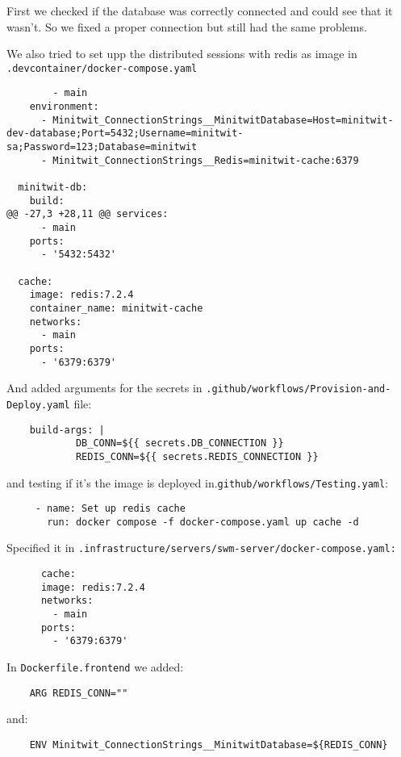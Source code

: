 First we checked if the database was correctly connected and could see that it wasn't. So we fixed a proper connection but still had the same problems.

We also tried to set upp the distributed sessions with redis as image in \texttt{.devcontainer/docker-compose.yaml}

\begin{verbatim}
        - main
    environment:
      - Minitwit_ConnectionStrings__MinitwitDatabase=Host=minitwit-dev-database;Port=5432;Username=minitwit-sa;Password=123;Database=minitwit
      - Minitwit_ConnectionStrings__Redis=minitwit-cache:6379

  minitwit-db:
    build:
@@ -27,3 +28,11 @@ services:
      - main
    ports:
      - '5432:5432'

  cache:
    image: redis:7.2.4
    container_name: minitwit-cache
    networks:
      - main
    ports:
      - '6379:6379'
\end{verbatim}

And added arguments for the secrets in \texttt{.github/workflows/Provision-and-Deploy.yaml} file:

\begin{verbatim}
    build-args: |
            DB_CONN=${{ secrets.DB_CONNECTION }}
            REDIS_CONN=${{ secrets.REDIS_CONNECTION }}
\end{verbatim}

and testing if it's the image is deployed in.\texttt{github/workflows/Testing.yaml}:

\begin{verbatim}
     - name: Set up redis cache
       run: docker compose -f docker-compose.yaml up cache -d
\end{verbatim}

Specified it in \texttt{.infrastructure/servers/swm-server/docker-compose.yaml:}

\begin{verbatim}
      cache:
      image: redis:7.2.4
      networks:
        - main
      ports:
        - '6379:6379'
\end{verbatim}

In \texttt{Dockerfile.frontend} we added:

\begin{verbatim}
    ARG REDIS_CONN=""
\end{verbatim}

and:

\begin{verbatim}
    ENV Minitwit_ConnectionStrings__MinitwitDatabase=${REDIS_CONN}
\end{verbatim}


